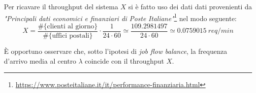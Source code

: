 Per ricavare il throughput del sistema $X$ si è fatto uso dei dati dati provenienti da \textsl{"Principali dati economici e finanziari di Poste Italiane"}\footnote{\url{https://www.posteitaliane.it/it/performance-finanziaria.html}} nel modo seguente:
\begin{equation}
X = \frac{\# \lbrace \text{clienti al giorno} \rbrace}{\# \lbrace \text{uffici postali} \rbrace} \cdot \frac{1}{24 \cdot 60} \simeq \frac{109.2981497}{24 \cdot 60} \simeq 0.0759015\ req/min
\end{equation} 

È opportuno osservare che, sotto l'ipotesi di \textsl{job flow balance}, la frequenza d'arrivo media al centro $\lambda$ coincide con il throughput $X$.


















